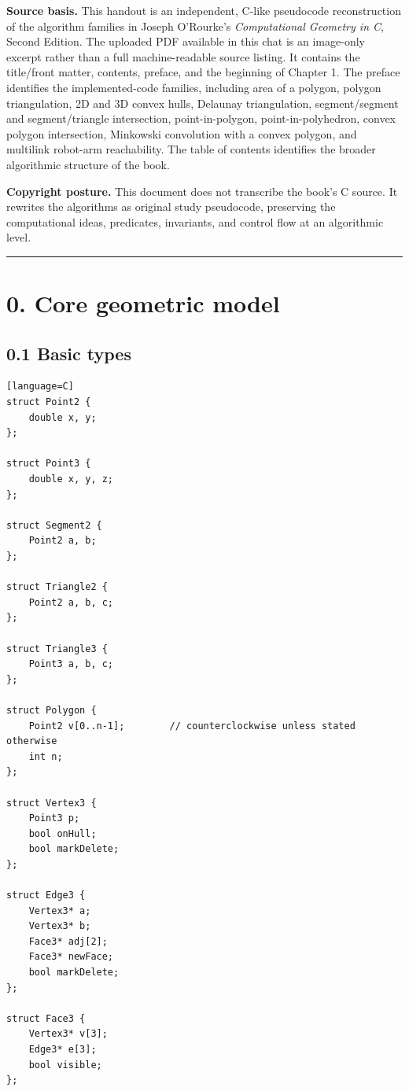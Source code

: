 \documentclass[11pt]{article}
\begin{document}
\textbf{Source basis.} This handout is an independent, C-like pseudocode
reconstruction of the algorithm families in Joseph O'Rourke's
\emph{Computational Geometry in C}, Second Edition. The uploaded PDF
available in this chat is an image-only excerpt rather than a full
machine-readable source listing. It contains the title/front matter,
contents, preface, and the beginning of Chapter 1. The preface
identifies the implemented-code families, including area of a polygon,
polygon triangulation, 2D and 3D convex hulls, Delaunay triangulation,
segment/segment and segment/triangle intersection, point-in-polygon,
point-in-polyhedron, convex polygon intersection, Minkowski convolution
with a convex polygon, and multilink robot-arm reachability. The table
of contents identifies the broader algorithmic structure of the book.

\textbf{Copyright posture.} This document does not transcribe the book's
C source. It rewrites the algorithms as original study pseudocode,
preserving the computational ideas, predicates, invariants, and control
flow at an algorithmic level.

\begin{center}\rule{0.5\linewidth}{0.5pt}\end{center}

\section{0. Core geometric model}\label{core-geometric-model}

\subsection{0.1 Basic types}\label{basic-types}

\begin{verbatim}[language=C]
struct Point2 {
    double x, y;
};

struct Point3 {
    double x, y, z;
};

struct Segment2 {
    Point2 a, b;
};

struct Triangle2 {
    Point2 a, b, c;
};

struct Triangle3 {
    Point3 a, b, c;
};

struct Polygon {
    Point2 v[0..n-1];        // counterclockwise unless stated otherwise
    int n;
};

struct Vertex3 {
    Point3 p;
    bool onHull;
    bool markDelete;
};

struct Edge3 {
    Vertex3* a;
    Vertex3* b;
    Face3* adj[2];
    Face3* newFace;
    bool markDelete;
};

struct Face3 {
    Vertex3* v[3];
    Edge3* e[3];
    bool visible;
};
\end{verbatim}
\end{document}
